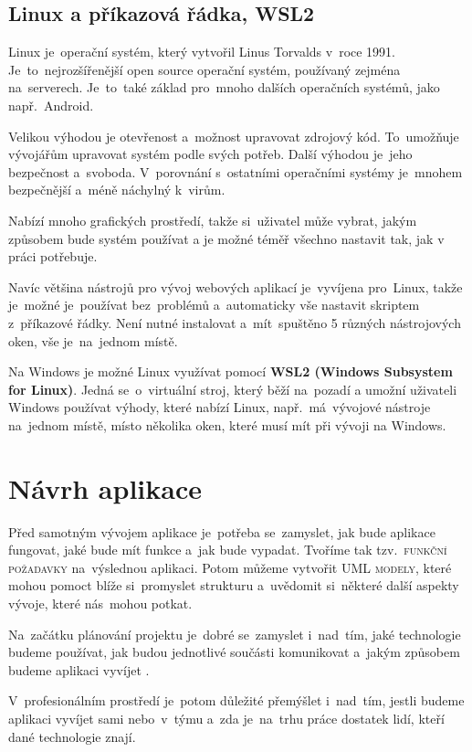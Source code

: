 \documentclass[14pt,a4paper]{article}
\begin{document}
        \subsection{Linux a příkazová řádka, WSL2}
        Linux je~operační systém, který vytvořil Linus Torvalds v~roce 1991. Je~to~nejrozšířenější open source operační systém,
        používaný zejména na~serverech. Je~to~také základ pro~mnoho dalších operačních systémů, jako např.~Android.
        
        Velikou výhodou je otevřenost a~možnost upravovat zdrojový kód. To~umožňuje vývojářům upravovat systém podle svých potřeb.
        Další výhodou je~jeho bezpečnost a~svoboda. V~porovnání s~ostatními operačními systémy je~mnohem bezpečnější a~méně náchylný k~virům.

        Nabízí mnoho grafických prostředí, takže si~uživatel může vybrat, jakým způsobem bude systém používat a je možné téměř
        všechno nastavit tak, jak v práci potřebuje.

        Navíc většina nástrojů pro vývoj webových aplikací je~vyvíjena pro~Linux, takže je~možné je~používat bez~problémů a~automaticky vše nastavit skriptem z~příkazové řádky. Není nutné instalovat a~mít~spuštěno 5 různých nástrojových oken, vše je~na~jednom místě.

        Na Windows je možné Linux využívat pomocí \textbf{WSL2 (Windows Subsystem for Linux)}. Jedná se~o~virtuální stroj, který běží na~pozadí a umožní uživateli Windows používat výhody, které nabízí Linux, např.~má~vývojové nástroje na~jednom místě, místo několika oken, které musí mít při vývoji na Windows.

	\section{Návrh aplikace}
        Před samotným vývojem aplikace je~potřeba se~zamyslet, jak bude aplikace fungovat, jaké bude mít funkce a~jak bude vypadat. Tvoříme tak tzv.~\textsc{funkční požadavky} na~výslednou aplikaci. Potom můžeme vytvořit \textsc{UML modely}, které mohou pomoct blíže si~promyslet strukturu a~uvědomit si~některé další aspekty vývoje, které nás~mohou potkat.

        Na~začátku plánování projektu je~dobré se~zamyslet i~nad~tím, jaké technologie budeme používat, jak budou jednotlivé součásti komunikovat a~jakým způsobem budeme aplikaci vyvíjet \parencite{bctynovsky:specifikacepozadavku}.
    
        V~profesionálním prostředí je~potom důležité přemýšlet i~nad~tím, jestli budeme aplikaci vyvíjet sami nebo~v~týmu a~zda je~na~trhu práce dostatek lidí, kteří dané technologie znají.
\end{document}
